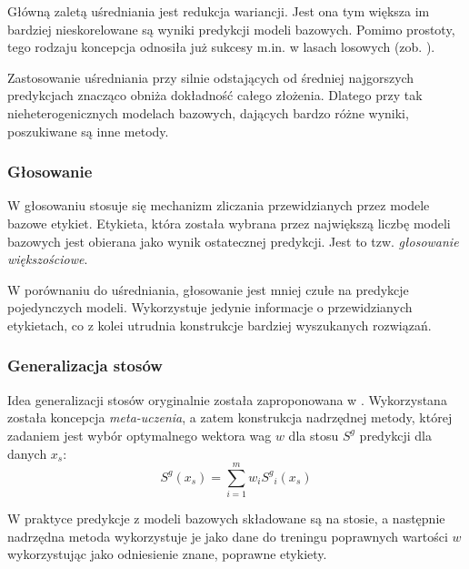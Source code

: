 Główną zaletą uśredniania jest redukcja wariancji. Jest ona tym większa \linebreak im bardziej nieskorelowane są wyniki predykcji modeli bazowych. Pomimo prostoty, tego rodzaju koncepcja odnosiła już sukcesy m.in. w lasach losowych (zob. \cite{Breiman2001}).

Zastosowanie uśredniania przy silnie odstających od średniej najgorszych predykcjach znacząco obniża dokładność całego złożenia. Dlatego przy tak nieheterogenicznych modelach bazowych, dających bardzo różne wyniki, poszukiwane są inne metody.

\subsubsection{Głosowanie}

W głosowaniu stosuje się mechanizm zliczania przewidzianych przez modele bazowe etykiet. Etykieta, która została wybrana przez największą liczbę modeli bazowych jest obierana jako wynik ostatecznej predykcji. Jest to tzw. \textit{głosowanie większościowe}.

W porównaniu do uśredniania, głosowanie jest mniej czułe na predykcje pojedynczych modeli. Wykorzystuje jedynie informacje o przewidzianych etykietach, \linebreak co z kolei utrudnia konstrukcje bardziej wyszukanych rozwiązań.

\subsubsection{Generalizacja stosów}
Idea generalizacji stosów oryginalnie została zaproponowana w \cite{Wolpert92stackedgeneralization}. Wykorzystana została koncepcja \textit{meta-uczenia}, a zatem konstrukcja nadrzędnej metody, której zadaniem jest wybór optymalnego wektora wag $w$ dla stosu $S^g$ predykcji dla danych $x_s$:
\begin{equation}
S^g(x_s) = \sum_{i=1}^{m}w_i {S^g}_i(x_s)
\end{equation}

W praktyce predykcje z modeli bazowych składowane są na stosie, a następnie nadrzędna metoda wykorzystuje je jako dane do treningu poprawnych wartości \linebreak $w$ wykorzystując jako odniesienie znane, poprawne etykiety.

    
